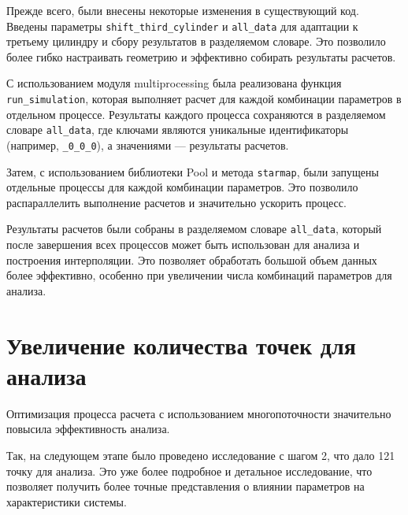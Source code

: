 \documentclass[a4paper,12pt]{article}
\theoremstyle{plain} %
\theoremstyle{definition} %
\theoremstyle{remark} %
\begin{document}
Прежде всего, были внесены некоторые изменения в существующий код. Введены параметры \texttt{shift\_third\_cylinder} и \texttt{all\_data} для адаптации к третьему цилиндру и сбору результатов в разделяемом словаре. Это позволило более гибко настраивать геометрию и эффективно собирать результаты расчетов.

С использованием модуля multiprocessing была реализована функция \texttt{run\_simulation}, которая выполняет расчет для каждой комбинации параметров в отдельном процессе. Результаты каждого процесса сохраняются в разделяемом словаре \texttt{all\_data}, где ключами являются уникальные идентификаторы (например, \texttt{\_0\_0\_0}), а значениями — результаты расчетов.

Затем, с использованием библиотеки Pool и метода \texttt{starmap}, были запущены отдельные процессы для каждой комбинации параметров. Это позволило распараллелить выполнение расчетов и значительно ускорить процесс.

Результаты расчетов были собраны в разделяемом словаре \texttt{all\_data}, который после завершения всех процессов может быть использован для анализа и построения интерполяции. Это позволяет обработать большой объем данных более эффективно, особенно при увеличении числа комбинаций параметров для анализа.

\section{Увеличение количества точек для анализа}

Оптимизация процесса расчета с использованием многопоточности значительно повысила эффективность анализа.

Так, на следующем этапе было проведено исследование с шагом 2, что дало 121 точку для анализа. Это уже более подробное и детальное исследование, что позволяет получить более точные представления о влиянии параметров на характеристики системы.
\end{document}
